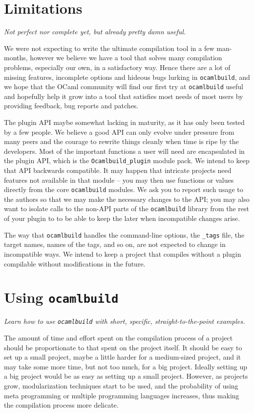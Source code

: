 \documentclass[9pt]{article}
\newcommand{\ocb}{\texttt{ocamlbuild}\xspace}
\newcommand{\tags}{\texttt{\_tags}\xspace}
\begin{document}
\section{Limitations}
{\em Not perfect nor complete yet, but already pretty damn useful.}

We were not expecting to write the ultimate compilation tool in a few man-months, however we believe we have
a tool that solves many compilation problems, especially our own, in a satisfactory way.  Hence there are a
lot of missing features, incomplete options and hideous bugs lurking in \ocb, and we hope that the OCaml community
will find our first try at \ocb useful and hopefully help it grow into a tool that satisfies most needs of most users
by providing feedback, bug reports and patches.

The plugin API maybe somewhat lacking in maturity, as it has only been tested
by a few people.  We believe a good API can only evolve under pressure from
many peers and the courage to rewrite things cleanly when time is ripe by the
developers.  Most of the important functions a user will need are encapsulated
in the plugin API, which is the \texttt{Ocamlbuild\_plugin} module pack.  We
intend to keep that API backwards compatible.  It may happen that intricate
projects need features not available in that module -- you may then use
functions or values directly from the core \ocb modules.  We ask you to report
such usage to the authors so that we may make the necessary changes to the API;
you may also want to isolate calls to the non-API parts of the \ocb library
from the rest of your plugin to to be able to keep the later when incompatible
changes arise.

The way that \ocb handles the command-line options, the \tags file,
the target names, names of the tags, and so on, are not expected to change in
incompatible ways.  We intend to keep a project that compiles without a plugin
compilable without modifications in the future.
\section{Using \ocb}
{\em Learn how to use \ocb with short, specific, straight-to-the-point examples.}

The amount of time and effort spent on the compilation process of a project
should be proportionate to that spent on the project itself.  It should be easy
to set up a small project, maybe a little harder for a medium-sized project,
and it may take some more time, but not too much, for a big project.  Ideally
setting up a big project would be as easy as setting up a small project.  However,
as projects grow, modularization techniques start to be used, and the probability
of using meta programming or multiple programming languages increases, thus making
the compilation process more delicate.
\end{document}
